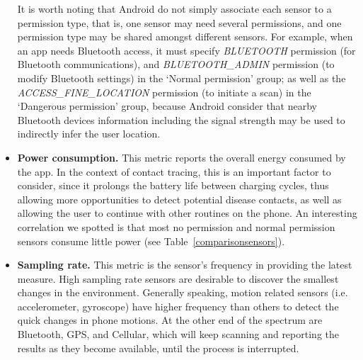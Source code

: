 \documentclass[graybox]{svmult}
\begin{document}
\begin{itemize}
    It is worth noting that Android do not simply associate each sensor to a permission type, that is, one sensor may need several permissions, and one permission type may be shared amongst different sensors. For example, when an app needs Bluetooth access, it must specify \textit{BLUETOOTH} permission (for Bluetooth communications), and \textit{BLUETOOTH\_ADMIN} permission (to modify Bluetooth settings) in the `Normal permission' group; as well as the \textit{ACCESS\_FINE\_LOCATION} permission (to initiate a scan) in the `Dangerous permission' group, because Android consider that nearby Bluetooth devices information including the signal strength may be used to indirectly infer the user location.
    
    \item \textbf{Power consumption.} This metric reports the overall energy consumed by the app. In the context of contact tracing, this is an important factor to consider, since it prolongs the battery life between charging cycles, thus allowing more opportunities to detect potential disease contacts, as well as allowing the user to continue with other routines on the phone. An interesting correlation we spotted is that most no permission and normal permission sensors consume little power (see Table~\ref{comparisonsensors}).
    
    \item \textbf{Sampling rate.} This metric is the sensor's frequency in providing the latest measure. High sampling rate sensors are desirable to discover the smallest changes in the environment. Generally speaking, motion related sensors (i.e. accelerometer, gyroscope) have higher frequency than others to detect the quick changes in phone motions. At the other end of the spectrum are Bluetooth, GPS, and Cellular, which will keep scanning and reporting the results as they become available, until the process is interrupted.
\end{itemize}
\end{document}
